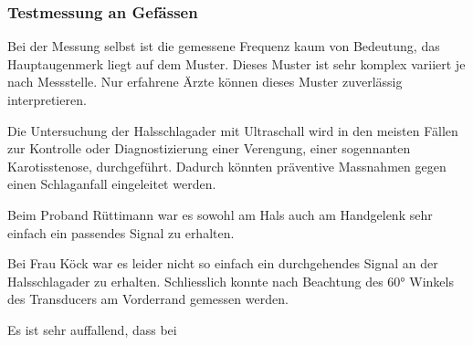 \documentclass[11pt]{scrartcl}
\begin{document}
    \subsubsection{Testmessung an Gefässen}
    Bei der Messung selbst ist die gemessene Frequenz kaum von Bedeutung, das Hauptaugenmerk liegt auf dem Muster.
    Dieses Muster ist sehr komplex variiert je nach Messstelle.
    Nur erfahrene Ärzte können dieses Muster zuverlässig interpretieren.

    Die Untersuchung der Halsschlagader mit Ultraschall wird in den meisten Fällen zur Kontrolle oder Diagnostizierung
    einer Verengung, einer sogennanten Karotisstenose, durchgeführt.
    Dadurch könnten präventive Massnahmen gegen einen Schlaganfall eingeleitet werden.


    Beim Proband Rüttimann war es sowohl am Hals auch am Handgelenk sehr einfach ein passendes Signal zu erhalten.

    Bei Frau Köck war es leider nicht so einfach ein durchgehendes Signal an der Halsschlagader zu erhalten.
    Schliesslich konnte nach Beachtung des 60° Winkels des Transducers am Vorderrand gemessen werden.

    Es ist sehr auffallend, dass bei


\end{document}
